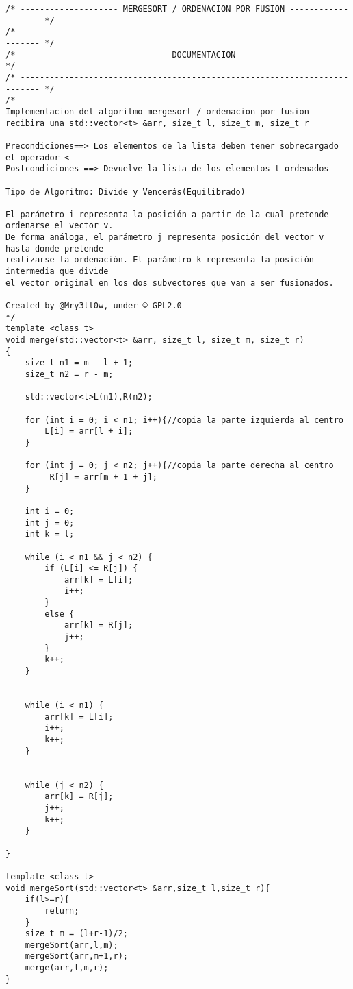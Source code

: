 \begin{lstlisting}
/* -------------------- MERGESORT / ORDENACION POR FUSION ------------------- */
/* -------------------------------------------------------------------------- */
/*                                DOCUMENTACION                               */
/* -------------------------------------------------------------------------- */
/*
Implementacion del algoritmo mergesort / ordenacion por fusion
recibira una std::vector<t> &arr, size_t l, size_t m, size_t r

Precondiciones==> Los elementos de la lista deben tener sobrecargado el operador <
Postcondiciones ==> Devuelve la lista de los elementos t ordenados

Tipo de Algoritmo: Divide y Vencerás(Equilibrado)

El parámetro i representa la posición a partir de la cual pretende ordenarse el vector v. 
De forma análoga, el parámetro j representa posición del vector v hasta donde pretende 
realizarse la ordenación. El parámetro k representa la posición intermedia que divide 
el vector original en los dos subvectores que van a ser fusionados.

Created by @Mry3ll0w, under © GPL2.0
*/
template <class t>
void merge(std::vector<t> &arr, size_t l, size_t m, size_t r)
{
    size_t n1 = m - l + 1;
    size_t n2 = r - m;
        
    std::vector<t>L(n1),R(n2);
   
    for (int i = 0; i < n1; i++){//copia la parte izquierda al centro
        L[i] = arr[l + i];
    }
        
    for (int j = 0; j < n2; j++){//copia la parte derecha al centro
         R[j] = arr[m + 1 + j];
    }

    int i = 0;
    int j = 0;
    int k = l;
 
    while (i < n1 && j < n2) {
        if (L[i] <= R[j]) {
            arr[k] = L[i];
            i++;
        }
        else {
            arr[k] = R[j];
            j++;
        }
        k++;
    }
 
  
    while (i < n1) {
        arr[k] = L[i];
        i++;
        k++;
    }
 
   
    while (j < n2) {
        arr[k] = R[j];
        j++;
        k++;
    }

}
 
template <class t>
void mergeSort(std::vector<t> &arr,size_t l,size_t r){
    if(l>=r){
        return;
    }
    size_t m = (l+r-1)/2;
    mergeSort(arr,l,m);
    mergeSort(arr,m+1,r);
    merge(arr,l,m,r);
}



\end{lstlisting}